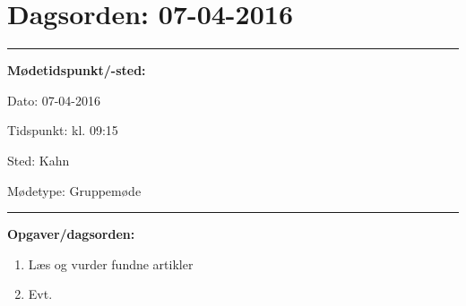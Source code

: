 \section{Dagsorden: 07-04-2016 }
\hrule
\textbf{Mødetidspunkt/-sted:} 

Dato: \tabto{7em} 07-04-2016

Tidspunkt: \tabto{7em} kl. 09:15 

Sted: \tabto{7em} Kahn

Mødetype: \tabto{7em} Gruppemøde \newline


\hrule
\textbf{Opgaver/dagsorden:} \newline
\begin{enumerate}
	\item Læs og vurder fundne artikler 
	\item Evt. 
\end{enumerate} 